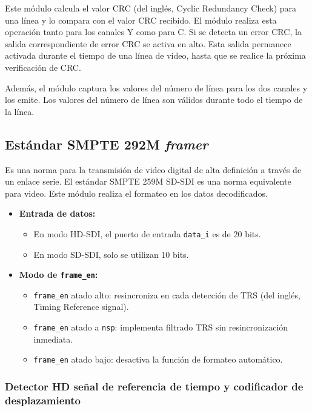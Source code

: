   Este módulo calcula el valor CRC (del inglés, Cyclic Redundancy Check) para una línea y lo compara con el valor CRC
  recibido. El módulo realiza esta operación tanto para los canales Y como para C.
  Si se detecta un error CRC, la salida correspondiente de error CRC se activa en
  alto. Esta salida permanece activada durante el tiempo de una línea de video,
  hasta que se realice la próxima verificación de CRC\@.

  Además, el módulo captura los valores del número de línea para los dos canales
  y los emite. Los valores del número de línea son válidos durante todo el tiempo
  de la línea.

\subsection{Estándar SMPTE 292M \textit{framer}}

Es una norma para la transmisión de video digital de alta definición a través
de un enlace serie. El estándar SMPTE 259M SD-SDI es una norma equivalente
para video. Este módulo realiza el formateo en los datos decodificados.

\begin{itemize}
    \item \textbf{Entrada de datos:}
    \begin{itemize}
        \item En modo HD-SDI, el puerto de entrada \texttt{data\_i} es de 20 bits.
        \item En modo SD-SDI, solo se utilizan 10 bits.
    \end{itemize}
    
    \item \textbf{Modo de \texttt{frame\_en}:}
    \begin{itemize}
        \item \texttt{frame\_en} atado alto: resincroniza en cada detección de TRS  (del inglés, Timing Reference signal).
        \item \texttt{frame\_en} atado a \texttt{nsp}: implementa filtrado TRS sin resincronización inmediata.
        \item \texttt{frame\_en} atado bajo: desactiva la función de formateo automático.
    \end{itemize}
\end{itemize}

\subsubsection{Detector HD señal de referencia de tiempo y codificador de desplazamiento}

